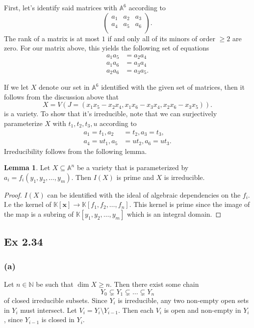 \documentclass{article}
\theoremstyle{definition}
\newtheorem{lemma}[theorem]{Lemma}
\newcommand{\K}{\mathbb{K}}
\newcommand{\N}{\mathbb{N}}
\newcommand{\A}{\mathbb{A}}
\newcommand{\Kx}{\K[\bm{x}]}
\newcommand{\An}{\A^n}
\begin{document}
First, let's identify said matrices with $\A^{6}$ according to
\[
\begin{pmatrix}
	a_1 & a_2 & a_3 \\
	a_4 & a_5 & a_6 \\
\end{pmatrix}.
\] 
The rank of a matrix is at most $1$ if and only all of its minors of 
order $\geq 2$ are zero. For our matrix above, this yields the following
set of equations
\begin{align*}
	a_1 a_5 &= a_2 a_4 \\
	a_1 a_6 &= a_3 a_4 \\
	a_2 a_6 &= a_3 a_5.
\end{align*}

If we let $X$ denote our set in $\A^{6}$ identified with the given set of
matrices, then it follows from the discussion above that 
\[
X = V(J = (x_1x_5 - x_2x_4, x_1x_6 - x_3x_4, x_2x_6 - x_3x_5)).
\] 
is a variety. To show that it's irreducible, note that we can surjectively
parameterize $X$ with $t_1, t_2, t_3, u$ according to 
\begin{align*}
	a_1 = t_1,
	a_2 &= t_2,
	a_3 = t_3, \\
	a_4 = ut_1 ,
	a_5 &= ut_2,
	a_6 = ut_3.
\end{align*}
Irreducibility follows from the following lemma. 
\begin{lemma}
	Let $X \subseteq \An$ be a variety that is parameterized by $a_i = f_i(y_1,
	y_2, \ldots, y_m)$. Then $I(X)$ is prime and $X$ is irreducible.
\end{lemma}
\begin{proof}
	$I(X)$ can be identified with the ideal of algebraic dependencies on the
	$f_i$. I.e the kernel of $\Kx \to \K[f_1, f_2, \ldots, f_n]$. This kernel
	is prime since the image of the map is a subring of $\K[y_1, y_2, \ldots,
	y_m]$ which is an integral domain.
\end{proof}


\subsection*{Ex 2.34} 

\subsubsection*{(a)} 

Let $n \in \N$ be such that $\dim X \geq n$. Then there exist some chain
\[
Y_0 \subsetneq Y_1 \subsetneq \ldots \subsetneq Y_n
\] 
of closed irreducible subsets. Since $Y_i$ is irreducible, any two non-empty
open sets in $Y_i$ must intersect. Let $V_i = Y_i \setminus Y_{i - 1}$. Then
each $V_i$ is open and non-empty in $Y_i$, since $Y_{i - 1}$ is closed in
$Y_i$. \\
\end{document}
